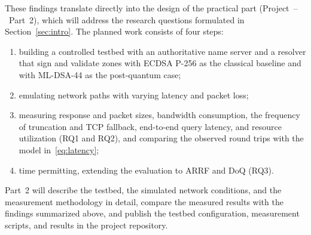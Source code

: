 \documentclass[conference]{IEEEtran}
\begin{document}
These findings translate directly into the design of the practical part
(Project~--~Part~2), which will address the research questions formulated in
Section~\ref{sec:intro}. The planned work consists of four steps:
\begin{enumerate}
\item building a controlled testbed with an authoritative name server and a
resolver that sign and validate zones with ECDSA P-256 as the classical
baseline and with ML-DSA-44 as the post-quantum case;
\item emulating network paths with varying latency and packet loss;
\item measuring response and packet sizes, bandwidth consumption, the
frequency of truncation and TCP fallback, end-to-end query latency, and
resource utilization (RQ1 and RQ2), and comparing the observed round trips
with the model in~\eqref{eq:latency};
\item time permitting, extending the evaluation to ARRF and DoQ (RQ3).
\end{enumerate}
Part~2 will describe the testbed, the simulated network conditions, and the
measurement methodology in detail, compare the measured results with the
findings summarized above, and publish the testbed configuration, measurement
scripts, and results in the project repository.
\end{document}
